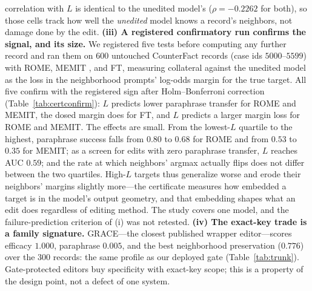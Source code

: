 \documentclass[10pt,twocolumn]{article}
\theoremstyle{remark}
\begin{document}
correlation with $L$ is identical to the unedited model's ($\rho=-0.2262$ for
both), so those cells track how well the \emph{unedited} model knows a
record's neighbors, not damage done by the edit.
\textbf{(iii) A registered confirmatory run confirms the signal, and its
size.} We registered five tests before computing any further record and ran
them on $600$ untouched CounterFact records (case ids $5000$--$5599$) with
ROME, MEMIT \citep{meng2022memit}, and FT, measuring collateral against the
unedited model as the loss in the neighborhood prompts' log-odds margin for
the true target. All five confirm with the registered sign after
Holm--Bonferroni correction (Table~\ref{tab:certconfirm}): $L$ predicts lower
paraphrase transfer for ROME and MEMIT, the dosed margin does for FT, and $L$
predicts a larger margin loss for ROME and MEMIT. The effects are small. From
the lowest-$L$ quartile to the highest, paraphrase success falls from $0.80$
to $0.68$ for ROME and from $0.53$ to $0.35$ for MEMIT; as a screen for edits
with zero paraphrase transfer, $L$ reaches AUC $0.59$; and the rate at which
neighbors' argmax actually flips does not differ between the two quartiles.
High-$L$ targets thus generalize worse and erode their neighbors' margins
slightly more---the certificate measures how embedded a target is in the
model's output geometry, and that embedding shapes what an edit does
regardless of editing method. The study covers one model, and the
failure-prediction criterion of (i) was not retested.
\textbf{(iv) The exact-key trade is a family signature.} GRACE---the closest
published wrapper editor---scores efficacy $1.000$, paraphrase $0.005$, and the
best neighborhood preservation ($0.776$) over the $300$ records: the same
profile as our deployed gate (Table~\ref{tab:trunk}). Gate-protected editors buy
specificity with exact-key scope; this is a property of the design point, not a
defect of one system.
\end{document}
